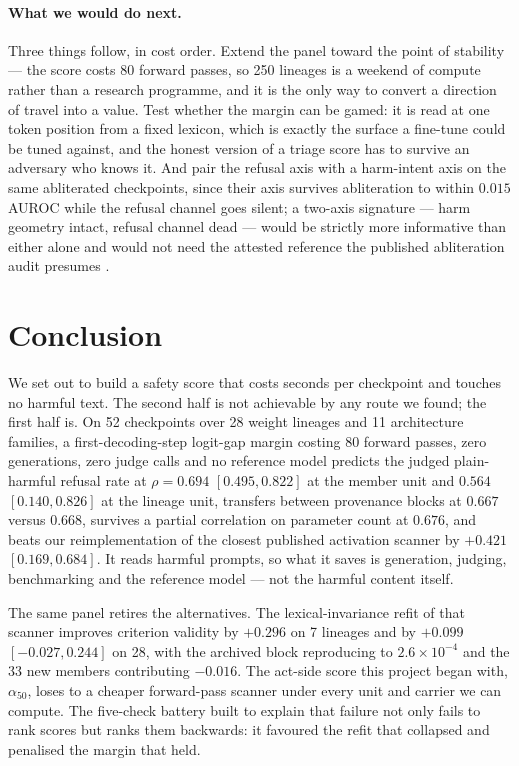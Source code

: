 \documentclass[11pt,letterpaper]{article}
\begin{document}
\paragraph{What we would do next.} Three things follow, in cost order. Extend the panel toward the point of stability --- the score costs 80 forward passes, so 250 lineages is a weekend of compute rather than a research programme, and it is the only way to convert a direction of travel into a value. Test whether the margin can be gamed: it is read at one token position from a fixed lexicon, which is exactly the surface a fine-tune could be tuned against, and the honest version of a triage score has to survive an adversary who knows it. And pair the refusal axis with a harm-intent axis \citep{Llorente2026} on the same abliterated checkpoints, since their axis survives abliteration to within $0.015$ AUROC while the refusal channel goes silent; a two-axis signature --- harm geometry intact, refusal channel dead --- would be strictly more informative than either alone and would not need the attested reference the published abliteration audit presumes \citep{Hurtado2026}.

\section{Conclusion}

We set out to build a safety score that costs seconds per checkpoint and touches no harmful text. The second half is not achievable by any route we found; the first half is. On 52 checkpoints over 28 weight lineages and 11 architecture families, a first-decoding-step logit-gap margin costing 80 forward passes, zero generations, zero judge calls and no reference model predicts the judged plain-harmful refusal rate at $\rho = 0.694$ $[0.495, 0.822]$ at the member unit and $0.564$ $[0.140, 0.826]$ at the lineage unit, transfers between provenance blocks at $0.667$ versus $0.668$, survives a partial correlation on parameter count at $0.676$, and beats our reimplementation of the closest published activation scanner by $+0.421$ $[0.169, 0.684]$. It reads harmful prompts, so what it saves is generation, judging, benchmarking and the reference model --- not the harmful content itself.

The same panel retires the alternatives. The lexical-invariance refit of that scanner improves criterion validity by $+0.296$ on 7 lineages and by $+0.099$ $[-0.027, 0.244]$ on 28, with the archived block reproducing to $2.6\times10^{-4}$ and the 33 new members contributing $-0.016$. The act-side score this project began with, $\alpha_{50}$, loses to a cheaper forward-pass scanner under every unit and carrier we can compute. The five-check battery built to explain that failure not only fails to rank scores but ranks them backwards: it favoured the refit that collapsed and penalised the margin that held.
\end{document}
